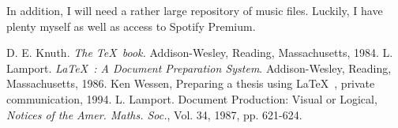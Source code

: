 \documentclass[12pt, a4paper]{article}
\begin{document}
In addition, I will need a rather large repository of music files. Luckily,
I have plenty myself as well as access to Spotify Premium.

\begin{thebibliography}{9}
 D. E. Knuth. {\em The \TeX~book.}\/ Addison-Wesley,
Reading, Massachusetts, 1984.
 L. Lamport. {\em \LaTeX~: A Document Preparation
System}.\/ Addison-Wesley, Reading, Massachusetts, 1986.
 Ken Wessen, Preparing a thesis using \LaTeX~, private
communication, 1994.
 L. Lamport. Document Production: Visual
or Logical, {\em Notices of the Amer. Maths. Soc.},\/ Vol. 34,
1987, pp. 621-624.
\end{thebibliography}
\end{document}
